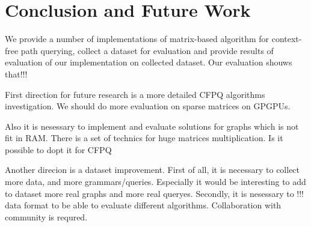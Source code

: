 \section{Conclusion and Future Work}

We provide a number of implementations of matrix-based algorithm for context-free path querying, collect a dataset for evaluation and provide results of evaluation of our implementation on collected dataset.
Our evaluation shouws that!!!

First direction for future research is a more detailed CFPQ algorithms investigation.
We should do more evaluation on sparse matrices on GPGPUs.

Also it is nesessary to implement and evaluate solutions for graphs which is not fit in RAM.
There is a set of technics for huge matrices multiplication.
Is it possible to dopt it for CFPQ

Another direcion is a dataset improvement.
First of all, it is necessary to collect more data, and more grammars/queries.
Especially it would be interesting to add to dataset more real graphs and more real queryes.
Secondly, it is nesessary to !!! data format to be able to evaluate different algorithms.
Collaboration with community is requred.

